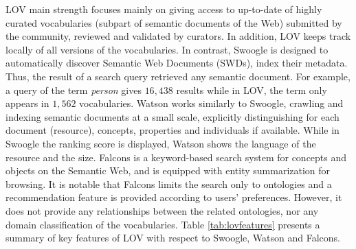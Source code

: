 \documentclass{iosart2c}
\begin{document}
LOV main strength focuses mainly on giving access to up-to-date of highly curated vocabularies (subpart of semantic documents of the Web) submitted by the community, reviewed and validated by curators. In addition, LOV keeps track locally of all versions of the vocabularies.  In contrast, Swoogle is designed to automatically discover Semantic Web Documents (SWDs), index their metadata. Thus, the result of a search query retrieved any semantic document. For example, a query of the term \textit{person} gives $16,438$ results while in LOV, the term only appears in $1,562$ vocabularies.
Watson works similarly to Swoogle, crawling and indexing semantic documents at a small scale, explicitly distinguishing for each document (resource), concepts, properties and individuals if available. While in Swoogle  the ranking score is displayed, Watson shows the language of the resource and the size. Falcons is a keyword-based search system for concepts and objects on the Semantic Web, and is equipped with entity summarization for browsing. It is notable that Falcons limits the search only to ontologies and a recommendation feature is provided according to users' preferences. However, it does not provide any relationships between the related ontologies, nor any domain classification of the vocabularies.
Table \ref{tab:lovfeatures} presents a summary of key features of LOV with respect to Swoogle, Watson and Falcons.
\end{document}
